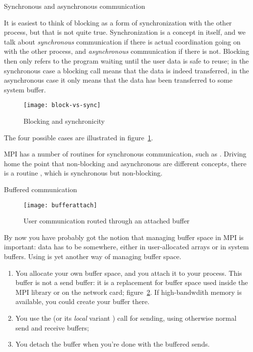 {Synchronous and asynchronous communication}
\label{sec:syncsend}

It is easiest to think of blocking as a form of synchronization with
the other process, but that is not quite true. Synchronization is a
concept in itself, and we talk about \emph{synchronous} communication
if there is actual coordination going on with the other process,
and \emph{asynchronous} communication if there is not. Blocking then
only refers to the program waiting until the user data is safe
to reuse; in the synchronous case a blocking call means that the data
is indeed transferred, in the asynchronous case it only means that the
data has been transferred to some system buffer.
%
\begin{figure}[ht]
\texttt{[image: block-vs-sync]}
\caption{Blocking and synchronicity}
\label{fig:block-sync}
\end{figure}
The four possible cases are illustrated in figure~\ref{fig:block-sync}.

MPI has a number of routines for synchronous communication,
such as .
Driving home the point that non-blocking and asynchronous are
different concepts, there is a routine ,
which is synchronous but non-blocking.



 {Buffered communication}
\label{sec:buffered}

\begin{figure}[ht]
  \texttt{[image: bufferattach]}
  \caption{User communication routed through an attached buffer}
  \label{fig:bufattach}
\end{figure}

By now you have probably got the notion that managing buffer
space in MPI is important: data has to be somewhere, either in
user-allocated arrays or in system buffers. Using
 is yet another
way of managing buffer space.
\begin{enumerate}
\item You allocate your own buffer space, and you attach it to your
  process. This buffer is not a send buffer: it is a replacement for
  buffer space used inside the MPI library or on the network card;
  figure~\ref{fig:bufattach}. If high-bandwdith memory is available,
  you could create your buffer there.
\item You use the 
  (or its \emph{local} variant )
  call for sending, using
  otherwise normal send and receive buffers;
\item You detach the buffer when you're done with the buffered sends.
\end{enumerate}

